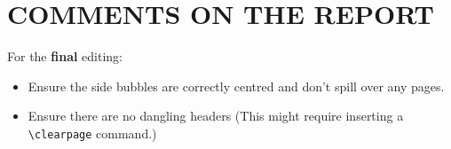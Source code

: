 \documentclass[english,a4,oneside,9pt]{extarticle}
\begin{document}
\section{COMMENTS ON THE REPORT}
For the \textbf{final} editing:
\begin{itemize}
    \item Ensure the side bubbles are correctly centred and don't spill over any pages. 
    \item Ensure there are no dangling headers (This might require inserting a \verb|\clearpage| command.)
\end{itemize}
\clearpage
\end{document}
